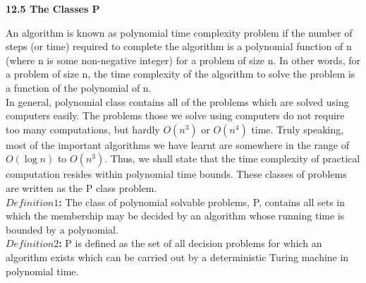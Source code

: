 \documentclass[9pt]{beamer}
\begin{document}
\begin{frame}
\large{
\textbf{12.5 The Classes P} \\
}

\vspace*{0.2cm}
\small{
An algorithm is known as polynomial time complexity problem if the number of steps (or time) required
to complete the algorithm is a polynomial function of n (where n is some non-negative integer) for a
problem of size n. In other words, for a problem of size n, the time complexity of the algorithm to solve
the problem is a function of the polynomial of n.\\
\hspace*{0.5cm} In general, polynomial class contains all of the problems which are solved using computers easily.
The problems those we solve using computers do not require too many computations, but hardly
$O(n^{3})$ or $O(n^{4})$ time. Truly speaking, most of the important algorithms we have learnt are somewhere
in the range of $O(\log n)$ to $O(n^{3})$. Thus, we shall state that the time complexity of practical computation
resides within polynomial time bounds. These classes of problems are written as the P class
problem.\\

\vspace*{0.2cm}
\textbf{$Definition1$:} The class of polynomial solvable problems, P, contains all sets in which the membership
may be decided by an algorithm whose running time is bounded by a polynomial.\\

\vspace*{0.2cm}
\textbf{$Definition 2$:} P is defined as the set of all decision problems for which an algorithm exists which can be
carried out by a deterministic Turing machine in polynomial time.\\
}
\end{frame}
\end{document}
